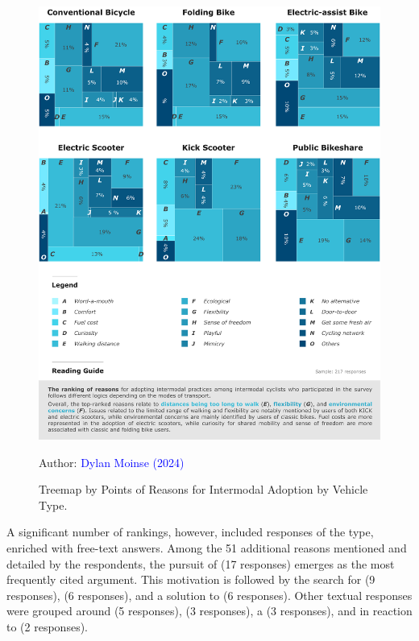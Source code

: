 \begin{refsegment}
\begin{figure}[h!]\vspace*{4pt}
    \caption{Treemap by Points of Reasons for Intermodal Adoption by Vehicle Type.}
    \label{fig-chap4:raisons-adoption-modale-points-modes}
    \centerline{\includegraphics[width=1\columnwidth]{src/Figures/Chap-4/EN_Treemap_raisons_adoption.pdf}}
    \vspace{5pt}
    \begin{flushright}\scriptsize{
    Author: \textcolor{blue}{Dylan Moinse (2024)}
    }\end{flushright}
\end{figure}

A significant number of rankings, however, included responses of the  type, enriched with free-text answers. Among the 51 additional reasons mentioned and detailed by the respondents, the pursuit of  (17 responses) emerges as the most frequently cited argument. This motivation is followed by the search for  (9 responses),  (6 responses), and a solution to  (6 responses). Other textual responses were grouped around  (5 responses),  (3 responses), a  (3 responses), and in reaction to  (2 responses).%


\end{refsegment}
